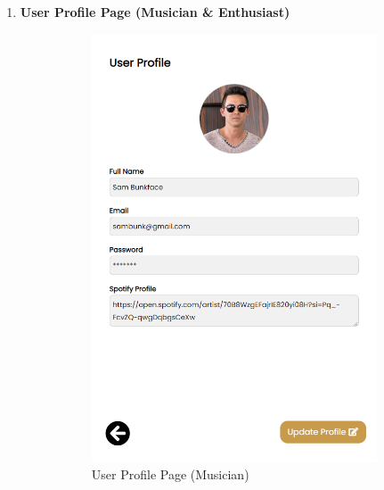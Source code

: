 \begin{enumerate}[1.]
    \item \textbf{User Profile Page (Musician \& Enthusiast)}
    \begin{figure}[h]
        \centering
        \begin{subfigure}[b]{0.4\textwidth}
            \centering
            \includegraphics[width=\textwidth]{mainmatter/images/frontend/ss/User Profile (Musician-Enthusiast).png}
            \caption{User Profile Page (Musician)}
            \label{fig:sub1}
        \end{subfigure}
        \hspace{0.05\textwidth}
        \begin{subfigure}[b]{0.4\textwidth}
            \centering

\end{subfigure}
\end{figure}
\end{enumerate}
